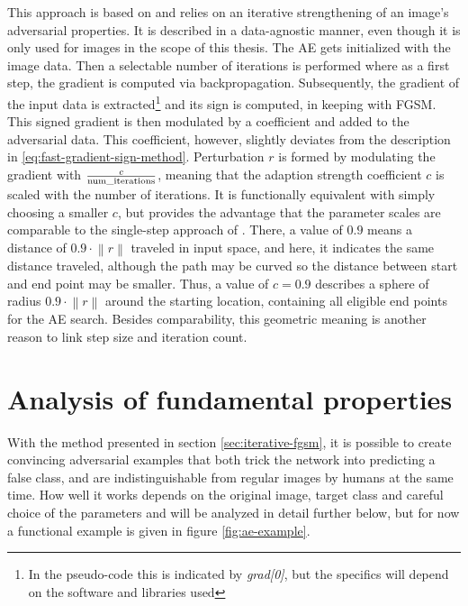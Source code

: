 \documentclass[11pt, a4paper]{article}
\newcommand{\norm}[1]{\left\lVert#1\right\rVert}
\begin{document}
This approach is based on \cite{how-to-trick-neural-network-panda-to-vulture} and relies on an iterative strengthening of an image's adversarial properties. It is described in a data-agnostic manner, even though it is only used for images in the scope of this thesis. The AE gets initialized with the image data. Then a selectable number of iterations is performed where as a first step, the gradient is computed via backpropagation. Subsequently, the gradient of the input data is extracted\footnote{In the pseudo-code this is indicated by \emph{grad[0]}, but the specifics will depend on the software and libraries used} and its sign is computed, in keeping with FGSM. This signed gradient is then modulated by a coefficient and added to the adversarial data. This coefficient, however, slightly deviates from the description in \eqref{eq:fast-gradient-sign-method}. Perturbation $r$ is formed by modulating the gradient with $\frac{c}{\text{num\_iterations}}$, meaning that the adaption strength coefficient $c$ is scaled with the number of iterations. It is functionally equivalent with simply choosing a smaller $c$, but provides the advantage that the parameter scales are comparable to the single-step approach of \cite{explaining-and-harnessing-adversarial-examples}. There, a value of $0.9$ means a distance of $0.9 \cdot \norm{r}$ traveled in input space, and here, it indicates the same distance traveled, although the path may be curved so the distance between start and end point may be smaller. Thus, a value of $c = 0.9$ describes a sphere of radius $0.9 \cdot \norm{r}$ around the starting location, containing all eligible end points for the AE search. Besides comparability, this geometric meaning is another reason to link step size and iteration count.











\section{Analysis of fundamental properties}
\label{sec:fundamental-properties}
With the method presented in section \ref{sec:iterative-fgsm}, it is possible to create convincing adversarial examples that both trick the network into predicting a false class, and are indistinguishable from regular images by humans at the same time. How well it works depends on the original image, target class and careful choice of the parameters and will be analyzed in detail further below, but for now a functional example is given in figure \ref{fig:ae-example}.
\end{document}
